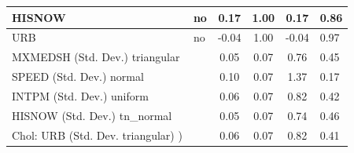 \begin{table}
\begin{center}
\begin{tabular}{|l|l|c|c|c|l|}
			\hline
			HISNOW & no & 0.17 & 1.00 & 0.17 & 0.86 \\
			\hline
			URB & no & -0.04 & 1.00 & -0.04 & 0.97 \\
			\hline
			MXMEDSH (Std. Dev.) triangular &  & 0.05 & 0.07 & 0.76 & 0.45 \\
			\hline
			SPEED (Std. Dev.) normal &  & 0.10 & 0.07 & 1.37 & 0.17 \\
			\hline
			INTPM (Std. Dev.) uniform &  & 0.06 & 0.07 & 0.82 & 0.42 \\
			\hline
			HISNOW (Std. Dev.) tn_normal &  & 0.05 & 0.07 & 0.74 & 0.46 \\
			\hline
			 Chol: URB (Std. Dev. triangular) ) &  & 0.06 & 0.07 & 0.82 & 0.41 \\
			\hline
		\end{tabular}
	\end{center}
\end{table}